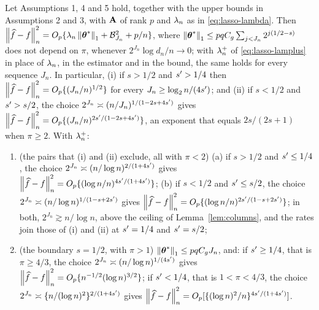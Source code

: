 \begin{proposition}
\label{prop:lasso-slow}
Let Assumptions 1, 4 and 5 hold, together with the upper
bounds in Assumptions 2 and 3, with $\mathbf{A}$ of rank $p$ and $\lambda_{n}$ as in
\eqref{eq:lasso-lambda}. Then
$\left\lVert \widehat{f}-f \right\rVert_{n}^{2} = O_p\{\lambda_{n}\left\lVert \boldsymbol{\theta}^{*} \right\rVert_{1} +
\mathcal{B}_{J_n}^{2} + p/n\}$, where
$\left\lVert \boldsymbol{\theta}^{*} \right\rVert_{1} \le pqC_g\sum_{j<J_n}2^{j(1/2-s)}$ does not
depend on $\pi$, whenever $2^{J_n}\log d_n/n \to 0$; with $\lambda_{n}^{+}$ of
\eqref{eq:lasso-lamplus} in place of $\lambda_{n}$, in the estimator and in the
bound, the same holds for every sequence $J_n$. In particular, (i) if $s > 1/2$ and $s' > 1/4$ then
$\left\lVert \widehat{f}-f \right\rVert_{n}^{2} = O_p\{(J_n/n)^{1/2}\}$ for every
$J_n \ge \log_2 n/(4s')$; and (ii) if $s < 1/2$ and $s' > s/2$, the choice
$2^{J_n} \asymp (n/J_n)^{1/(1-2s+4s')}$ gives
$\left\lVert \widehat{f}-f \right\rVert_{n}^{2} = O_p\{(J_n/n)^{2s'/(1-2s+4s')}\}$, an
exponent that equals $2s/(2s+1)$ when $\pi \ge 2$. With $\lambda_{n}^{+}$:
\begin{enumerate}
\item[(iii)] (the pairs that (i) and (ii) exclude, all with $\pi < 2$)
(a) if $s > 1/2$ and $s' \le 1/4$, the choice
$2^{J_n} \asymp (n/\log n)^{2/(1+4s')}$ gives
$\left\lVert \widehat{f}-f \right\rVert_{n}^{2} = O_p\{(\log n/n)^{4s'/(1+4s')}\}$;
(b) if $s < 1/2$ and $s' \le s/2$, the choice
$2^{J_n} \asymp (n/\log n)^{1/(1-s+2s')}$ gives
$\left\lVert \widehat{f}-f \right\rVert_{n}^{2} = O_p\{(\log n/n)^{2s'/(1-s+2s')}\}$;
in both, $2^{J_n} \gtrsim n/\log n$, above the ceiling of
Lemma~\ref{lem:columns}, and the rates join those of (i) and (ii) at
$s' = 1/4$ and $s' = s/2$;
\item[(iv)] (the boundary $s = 1/2$, with $\pi > 1$)
$\left\lVert \boldsymbol{\theta}^{*} \right\rVert_{1} \le pqC_gJ_n$, and: if $s' \ge 1/4$, that is
$\pi \ge 4/3$, the choice $2^{J_n} \asymp (n/\log n)^{1/(4s')}$ gives
$\left\lVert \widehat{f}-f \right\rVert_{n}^{2} = O_p\{n^{-1/2}(\log n)^{3/2}\}$; if
$s' < 1/4$, that is $1 < \pi < 4/3$, the choice
$2^{J_n} \asymp \{n/(\log n)^{2}\}^{2/(1+4s')}$ gives
$\left\lVert \widehat{f}-f \right\rVert_{n}^{2} = O_p[\{(\log n)^{2}/n\}^{4s'/(1+4s')}]$.
\end{enumerate}
\end{proposition}

